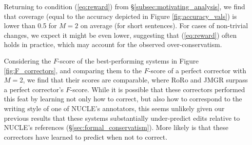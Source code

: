 \documentclass[letterpaper, 11pt]{article}
\begin{document}
%
%
%

Returning to condition (\ref{eq:reward}) from \S\ref{subsec:motivating_analysis}, we find that coverage (equal to the accuracy depicted in Figure \ref{fig:accuracy_vals}) is lower than 0.5 for $M=2$ on average (for short sentences). For cases of non-trivial changes, we expect it might be even lower, suggesting that (\ref{eq:reward}) often holds in practice, which may account for the observed over-conservatism.

Considering the $F$-score of the best-performing systems in Figure \ref{fig:F_correctors}, and comparing them to the $F$-score of a perfect corrector with $M=2$, we find that their scores are comparable, where RoRo and JMGR surpass a perfect corrector's $F$-score.
While it is possible that these correctors performed this feat by learning not only how to correct, but also how to correspond to the writing style of one of NUCLE's annotators, this seems unlikely given our previous results that these systems substantially under-predict edits relative to NUCLE's references (\S\ref{sec:formal_conservatism}). 
More likely is that these correctors have learned to predict when not to correct.
\end{document}

